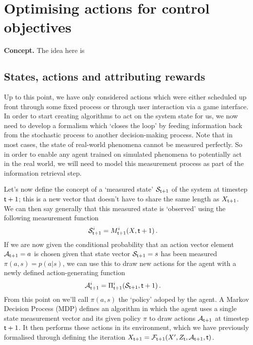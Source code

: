 \chapter{\sffamily Optimising actions for control objectives}

{\bfseries\sffamily Concept.} The idea here is 

\section{\sffamily States, actions and attributing rewards}

Up to this point, we have only considered actions which were either scheduled up front through some fixed process or through user interaction via a game interface. In order to start creating algorithms to act on the system state for us, we now need to develop a formalism which `closes the loop' by feeding information back from the stochastic process to another decision-making process. Note that in most cases, the state of real-world phenomena cannot be measured perfectly. So in order to enable any agent trained on simulated phenomena to potentially act in the real world, we will need to model this measurement process as part of the information retrieval step.

Let's now define the concept of a `measured state' ${\cal S}_{{\sf t}+1}$ of the system at timestep ${\sf t}+1$; this is a new vector that doesn't have to share the same length as $X_{{\sf t}+1}$. We can then say generally that this measured state is `observed' using the following measurement function
\begin{align}
{\cal S}_{{\sf t}+1}^i &= M_{{\sf t}+1}^i(X,{\sf t}+1) \label{eq:generalised-state-measurement} \,.
\end{align}
If we are now given the conditional probability that an action vector element ${\cal A}_{{\sf t}+1}=a$ is chosen given that state vector ${\cal S}_{{\sf t}+1}=s$ has been measured $\pi (a,s) = p(a\vert s)$, we can use this to draw new actions for the agent with a newly defined action-generating function
\begin{align}
{\cal A}_{{\sf t}+1}^i &= \Pi_{{\sf t}+1}^i({\cal S}_{{\sf t}+1}, {\sf t}+1) \label{eq:action-generating-function} \,.
\end{align}
From this point on we'll call $\pi (a,s)$ the `policy' adoped by the agent. A Markov Decision Process (MDP) defines an algorithm in which the agent uses a single state measurement vector and its given policy $\pi$ to draw actions ${\cal A}_{{\sf t}+1}$ at timestep ${{\sf t}+1}$. It then performs these actions in its environment, which we have previously formalised through defining the iteration $X_{{\sf t}+1} = {\cal F}_{{\sf t}+1}(X',Z_{\sf t},{\cal A}_{{\sf t}+1},{\sf t})$. 

